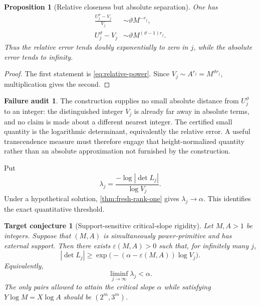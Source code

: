 \documentclass[11pt]{article}
\newtheorem{proposition}[theorem]{Proposition}
\newtheorem{conjecture}[theorem]{Target conjecture}
\theoremstyle{definition}
\newtheorem{audit}[theorem]{Failure audit}
\newcommand{\vtheta}{\vartheta}
\begin{document}
\begin{proposition}[Relative closeness but absolute separation]\label{prop:relative-not-absolute}
One has
\begin{align}
 \frac{U_j^{\vtheta}-V_j}{V_j}
 &\sim\vtheta M^{-r_j},\label{eq:relative-error}\\
 U_j^{\vtheta}-V_j
 &\sim\vtheta M^{(\vtheta-1)r_j}.
 \label{eq:absolute-error}
\end{align}
Thus the relative error tends doubly exponentially to zero in $j$, while the absolute
error tends to infinity.
\end{proposition}

\begin{proof}
The first statement is \eqref{eq:relative-power}.  Since
$V_j\sim A^{r_j}=M^{\vtheta r_j}$, multiplication gives the second.
\end{proof}

\begin{audit}
The construction supplies no small absolute distance from $U_j^{\vtheta}$ to an integer:
the distinguished integer $V_j$ is already far away in absolute terms, and no claim is made
about a different nearest integer.  The certified small quantity is the logarithmic
determinant, equivalently the relative error.  A useful transcendence measure must therefore
engage that height-normalized quantity rather than an absolute approximation not furnished by
the construction.
\end{audit}

Put
\begin{equation}\label{eq:height-slope}
 \lambda_j=\frac{-\log|\det L_j|}{\log V_j}.
\end{equation}
Under a hypothetical solution, \cref{thm:fresh-rank-one} gives
$\lambda_j\to\alpha$.  This identifies the exact quantitative threshold.

\begin{conjecture}[Support-sensitive critical-slope rigidity]
\label{conj:critical-rigidity}
Let $M,A>1$ be integers.  Suppose that $(M,A)$ is simultaneously power-primitive and
has external support.  Then there exists $\varepsilon(M,A)>0$ such that, for infinitely
many $j$,
\begin{equation}\label{eq:desired-lower}
 |\det L_j|
 \ge \exp\bigl(-(\alpha-\varepsilon(M,A))\log V_j\bigr).
\end{equation}
Equivalently,
\begin{equation}\label{eq:desired-slope}
 \liminf_{j\to\infty}\lambda_j<\alpha.
\end{equation}
The only pairs allowed to attain the critical slope $\alpha$ while satisfying
$Y\log M=X\log A$ should be $(2^m,3^m)$.
\end{conjecture}
\end{document}

